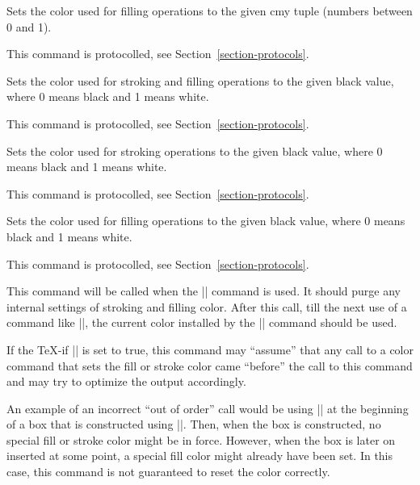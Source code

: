 \begin{command}{\pgfsys@color@cmy@fill{}}
    Sets the color used for filling operations to the given cmy tuple (numbers
    between 0 and 1).

    This command is protocolled, see Section~\ref{section-protocols}.
\end{command}

\begin{command}{\pgfsys@color@gray{}}
    Sets the color used for stroking and filling operations to the given black
    value, where 0 means black and 1 means white.

    This command is protocolled, see Section~\ref{section-protocols}.
\end{command}

\begin{command}{\pgfsys@color@gray@stroke{}}
    Sets the color used for stroking operations to the given black value, where
    0 means black and 1 means white.

    This command is protocolled, see Section~\ref{section-protocols}.
\end{command}

\begin{command}{\pgfsys@color@gray@fill{}}
    Sets the color used for filling operations to the given black value, where
    0 means black and 1 means white.

    This command is protocolled, see Section~\ref{section-protocols}.
\end{command}

\begin{command}{\pgfsys@color@reset}
    This command will be called when the |\color| command is used. It should
    purge any internal settings of stroking and filling color. After this call,
    till the next use of a command like |\pgfsys@color@rgb@fill|, the current
    color installed by the |\color| command should be used.

    If the \TeX-if |\pgfsys@color@reset@inorder| is set to true, this command
    may ``assume'' that any call to a color command that sets the fill or
    stroke color came ``before'' the call to this command and may try to
    optimize the output accordingly.

    An example of an incorrect ``out of order'' call would be using
    |\pgfsys@color@reset| at the beginning of a box that is constructed using
    |\setbox|. Then, when the box is constructed, no special fill or stroke
    color might be in force. However, when the box is later on inserted at some
    point, a special fill color might already have been set. In this case, this
    command is not guaranteed to reset the color correctly.
\end{command}


